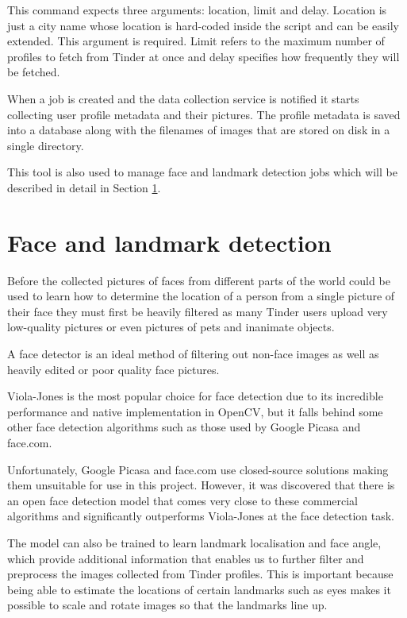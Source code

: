 This command expects three arguments: location, limit and delay. Location is 
just a city name whose location is hard-coded inside the script and can be 
easily extended. This argument is required. Limit refers to the maximum number 
of profiles to fetch from Tinder at once and delay specifies how frequently 
they will be fetched.

When a job is created and the data collection service is notified it starts
collecting user profile metadata and their pictures. The profile metadata is
saved into a database along with the filenames of images that are stored on
disk in a single directory.

This tool is also used to manage face and landmark detection jobs which will 
be described in detail in Section \ref{spec:fd}. 

\section{Face and landmark detection}
\label{spec:fd}
Before the collected pictures of faces from different parts of the world 
could be used to learn how to determine the location of a person from a single 
picture of their face they must first be heavily filtered as many Tinder users 
upload very low-quality pictures or even pictures of pets and inanimate 
objects.

A face detector is an ideal method of filtering out non-face images as well as
heavily edited or poor quality face pictures. 

Viola-Jones is the most popular choice for face detection due to its 
incredible performance and native implementation in OpenCV, but it falls 
behind some other face detection algorithms such as those used by 
Google Picasa and face.com.

Unfortunately, Google Picasa and face.com use closed-source 
solutions making them unsuitable for use in this project. However, it was 
discovered that there is an open face detection model that comes very close 
to these commercial algorithms and significantly outperforms Viola-Jones at
the face detection task.

The model can also be trained to learn landmark localisation and face angle, 
which provide additional information that enables us to further filter and 
preprocess the images collected from Tinder profiles. This is important 
because being able to estimate the locations of certain landmarks such as eyes 
makes it possible to scale and rotate images so that the landmarks line up.

